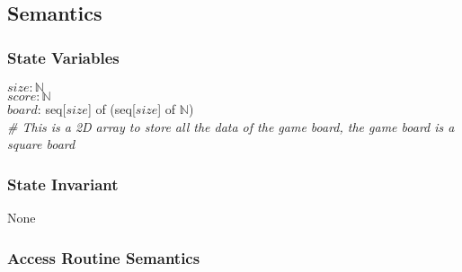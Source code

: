 \documentclass[12pt]{article}
\begin{document}
\subsection* {Semantics}

\subsubsection* {State Variables}

$\mathit{size}: \mathbb{N}$\\
$\mathit{score}: \mathbb{N}$\\
$\mathit{board}$: seq[$\mathit{size}$] of (seq[$\mathit{size}$] of $\mathbb{N}$) \\ \textit{\# This is a 2D array to store all the data of the game board, the game board is a square board}

\subsubsection* {State Invariant}

None

\subsubsection* {Access Routine Semantics}
\end{document}
